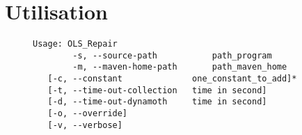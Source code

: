 \section{Utilisation}

\begin{figure}[H]

\begin{verbatim}
Usage: OLS_Repair
	    -s, --source-path           path_program
	    -m, --maven-home-path       path_maven_home
   [-c, --constant              one_constant_to_add]*
   [-t, --time-out-collection   time in second]
   [-d, --time-out-dynamoth     time in second]
   [-o, --override]
   [-v, --verbose]
\end{verbatim}

\end{figure}
	

	
		
		
		